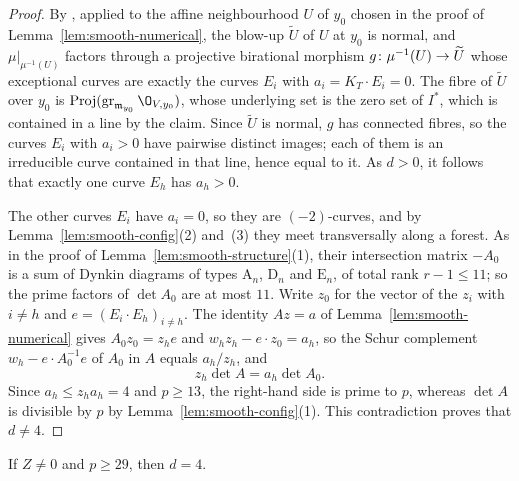 \begin{proof}
By \cite[Notation~5.3 and Theorem~5.19]{Tan25}, applied to the affine neighbourhood $U$ of $y_0$ chosen in the proof of Lemma~\ref{lem:smooth-numerical}, the blow-up $\widetilde U$ of $U$ at $y_0$ is normal, and $\mu|_{\mu^{-1}(U)}$ factors through a projective birational morphism $g\colon\mu^{-1}(U)\to\widetilde U$ whose exceptional curves are exactly the curves $E_i$ with $a_i = K_T\cdot E_i = 0$.
The fibre of $\widetilde U$ over $y_0$ is $\Proj(\operatorname{gr}_{\mathfrak m_{y_0}}\O_{V,y_0})$, whose underlying set is the zero set of $I^*$, which is contained in a line by the claim.
Since $\widetilde U$ is normal, $g$ has connected fibres, so the curves $E_i$ with $a_i>0$ have pairwise distinct images; each of them is an irreducible curve contained in that line, hence equal to it.
As $d>0$, it follows that exactly one curve $E_h$ has $a_h>0$.

The other curves $E_i$ have $a_i = 0$, so they are $(-2)$-curves, and by Lemma~\ref{lem:smooth-config}(2) and~(3) they meet transversally along a forest.
As in the proof of Lemma~\ref{lem:smooth-structure}(1), their intersection matrix $-A_0$ is a sum of Dynkin diagrams of types $\mathrm A_n$, $\mathrm D_n$ and $\mathrm E_n$, of total rank $r-1\leq 11$; so the prime factors of $\det A_0$ are at most $11$.
Write $z_0$ for the vector of the $z_i$ with $i\neq h$ and $e = (E_i\cdot E_h)_{i\neq h}$.
The identity $Az = a$ of Lemma~\ref{lem:smooth-numerical} gives $A_0z_0 = z_he$ and $w_hz_h-e\cdot z_0 = a_h$, so the Schur complement $w_h-e\cdot A_0^{-1}e$ of $A_0$ in $A$ equals $a_h/z_h$, and
\[
  z_h\det A = a_h\det A_0.
\]
Since $a_h\leq z_ha_h = 4$ and $p\geq 13$, the right-hand side is prime to $p$, whereas $\det A$ is divisible by $p$ by Lemma~\ref{lem:smooth-config}(1).
This contradiction proves that $d\neq 4$.
\end{proof}

\begin{proposition}\label{prop:smooth-enum}
If $Z\neq 0$ and $p\geq 29$, then $d = 4$.
\end{proposition}

